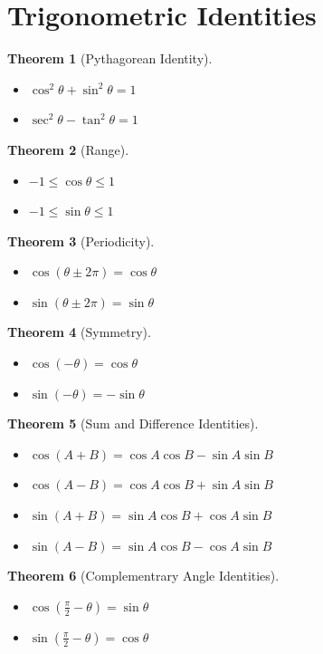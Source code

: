 \documentclass[12pt, letterpaper]{article}
\theoremstyle{break}
\newtheorem{theorem}{Theorem}
\begin{document}
\section{Trigonometric Identities}
%
\begin{theorem}[Pythagorean Identity]
    \begin{itemize}
        \item $\cos^2\theta + \sin^2\theta = 1$
        \item $\sec^2\theta - \tan^2\theta = 1$
    \end{itemize}
\end{theorem}
%
\begin{theorem}[Range]
    \begin{itemize}
        \item $-1 \leq \cos\theta \leq 1 $
        \item $-1 \leq \sin\theta \leq 1$
    \end{itemize}
\end{theorem}
%
\begin{theorem}[Periodicity]
    \begin{itemize}
        \item $\cos(\theta \pm 2\pi) = \cos\theta$
        \item $\sin(\theta \pm 2\pi) = \sin\theta$
    \end{itemize}
\end{theorem}
%
\begin{theorem}[Symmetry]
    \begin{itemize}
        \item $\cos(-\theta) = \cos\theta$
        \item $\sin(-\theta) = -\sin\theta$
    \end{itemize}
\end{theorem}
%
\begin{theorem}[Sum and Difference Identities]
    \begin{itemize}
        \item $\cos(A+B) = \cos A\cos B - \sin A\sin B$
        \item $\cos(A-B) = \cos A\cos B + \sin A\sin B$
        \item $\sin(A+B) = \sin A\cos B + \cos A\sin B$
        \item $\sin(A-B) = \sin A\cos B - \cos A\sin B$
    \end{itemize}
\end{theorem}
%
\begin{theorem}[Complementrary Angle Identities]
    \begin{itemize}
        \item $\cos(\frac{\pi}{2} - \theta) = \sin\theta$
        \item $\sin(\frac{\pi}{2} - \theta) = \cos\theta$
    \end{itemize}
\end{theorem}
\end{document}
